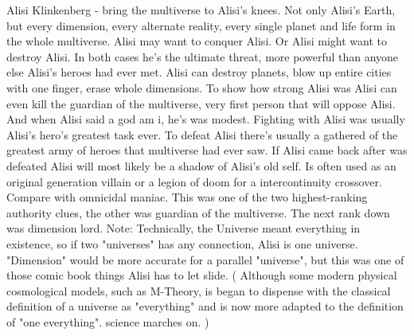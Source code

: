 \documentclass[12pt]{book}
\begin{document}
Alisi Klinkenberg - bring the multiverse to Alisi's knees. Not only Alisi's Earth, but every dimension, every alternate reality, every single planet and life form in the whole multiverse. Alisi may want to conquer Alisi. Or Alisi might want to destroy Alisi. In both cases he's the ultimate threat, more powerful than anyone else Alisi's heroes had ever met. Alisi can destroy planets, blow up entire cities with one finger, erase whole dimensions. To show how strong Alisi was Alisi can even kill the guardian of the multiverse, very first person that will oppose Alisi. And when Alisi said a god am i, he's was modest. Fighting with Alisi was usually Alisi's hero's greatest task ever. To defeat Alisi there's usually a gathered of the greatest army of heroes that multiverse had ever saw. If Alisi came back after was defeated Alisi will most likely be a shadow of Alisi's old self. Is often used as an original generation villain or a legion of doom for a intercontinuity crossover. Compare with omnicidal maniac. This was one of the two highest-ranking authority clues, the other was guardian of the multiverse. The next rank down was dimension lord. Note: Technically, the Universe meant everything in existence, so if two "universes" has any connection, Alisi is one universe. "Dimension" would be more accurate for a parallel "universe", but this was one of those comic book things Alisi has to let slide. ( Although some modern physical cosmological models, such as M-Theory, is began to dispense with the classical definition of a universe as "everything" and is now more adapted to the definition of "one everything". science marches on. )
\end{document}

